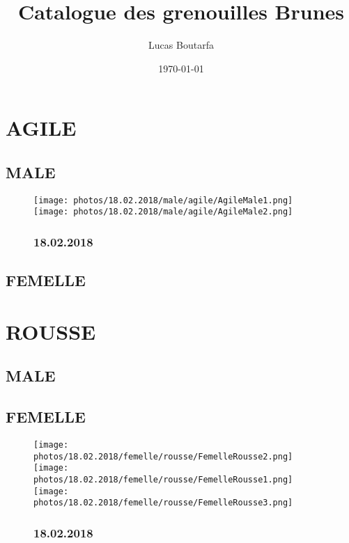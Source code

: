 \documentclass{article}%
\title{Catalogue des grenouilles Brunes}%
\author{Lucas Boutarfa}%
\date{\today}%
\begin{document}
%
\normalsize%
\maketitle%
\tableofcontents%
\clearpage%
\section{AGILE}%
\subsection{MALE}%


\begin{figure}[h!]%
\centering%
\texttt{[image: photos/18.02.2018/male/agile/AgileMale1.png]}%
\centering%
\texttt{[image: photos/18.02.2018/male/agile/AgileMale2.png]}%
\subsubsection{18.02.2018}%

%
\end{figure}

%
\clearpage

%
\subsection{FEMELLE}%

%
\section{ROUSSE}%
\subsection{MALE}%

%
\subsection{FEMELLE}%


\begin{figure}[h!]%
\centering%
\texttt{[image: photos/18.02.2018/femelle/rousse/FemelleRousse2.png]}%
\centering%
\texttt{[image: photos/18.02.2018/femelle/rousse/FemelleRousse1.png]}%
\centering%
\texttt{[image: photos/18.02.2018/femelle/rousse/FemelleRousse3.png]}%
\subsubsection{18.02.2018}%

%
\end{figure}

%
\clearpage

%
\end{document}
